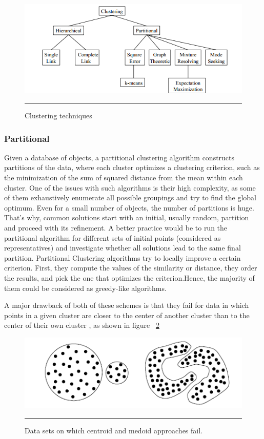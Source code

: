 \begin{figure}[htbp]
	\centering
		\includegraphics{./Figures/clustering.png}
		\rule{35em}{0.5pt}
	\caption[Clustering techniques]{Clustering techniques}
	\label{fig:clustering_approaches}
\end{figure}

\subsubsection{Partitional}
Given a database of objects, a partitional clustering algorithm constructs
partitions of the data, where each cluster optimizes a clustering criterion, such as the minimization of the sum of squared distance from the mean within each cluster.
One of the issues with such algorithms is their high complexity, as some of them exhaustively enumerate
all possible groupings and try to find the global optimum. Even for a small number of objects,
the number of partitions is huge. That’s why, common solutions start with an initial, usually
random, partition and proceed with its refinement. A better practice would be to run the partitional algorithm for different sets of initial points (considered as representatives) and investigate whether all solutions lead to the same final partition.
Partitional Clustering algorithms try to locally improve a certain criterion. First, they compute the
values of the similarity or distance, they order the results, and pick the one that optimizes the criterion.Hence, the majority of them could be considered as greedy-like algorithms.


A major drawback of both of these schemes is that they fail for data in which points in a given cluster are closer
to the center of another cluster than to the center of their own cluster \citep{clustering_14}, as shown in figure ~\ref{fig:kmeans_fail}

\begin{figure}[htbp]
	\centering
		\includegraphics{./Figures/clustering_2.png}
		\rule{35em}{0.5pt}
	\caption[Data sets on which centroid and medoid approaches fail.]{Data sets on which centroid and medoid approaches fail.}
	\label{fig:kmeans_fail}
\end{figure}


